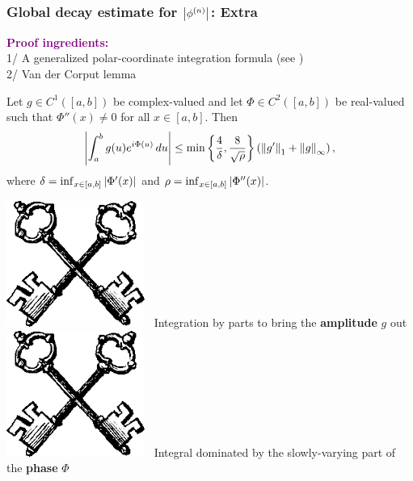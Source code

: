 \documentclass{beamer}
\theoremstyle{definition}
\newcommand{\lp}{\left(}
\newcommand{\rp}{\right)}
\newcommand{\lc}{\left\{}
\newcommand{\rc}{\right\}}
\begin{document}
\begin{frame}
\frametitle{Global decay estimate for $\abs{\phi^{(n)}}$: Extra}


\textcolor{purple}{\textbf{Proof ingredients:}} \\

1/ A generalized polar-coordinate integration formula (see \cite{bui2021generalized})\\
2/ Van der Corput lemma

\begin{lemma}
	Let $g\in C^1([a,b])$ be complex-valued and let $\Phi\in C^2([a,b])$ be real-valued such that $\Phi''(x) \neq 0$ for all $x\in [a,b]$. Then
	\begin{equation*}
	\abs{\int^b_a g(u) e^{i\Phi(u)}\,du} \leq \min \lc \frac{4}{\delta}, \frac{8}{\sqrt{\rho}}  \rc \lp \norm{g'}_1 + \norm{g}_\infty \rp,
	\end{equation*}
	where $\delta = \inf_{x\in [a,b]} \abs{\Phi'(x)}$ and $\rho = \inf_{x\in [a,b]} \abs{\Phi''(x)}$. 
\end{lemma}

\includegraphics[scale=0.06]{key}$\,\,\,$ Integration by parts to bring the \textbf{amplitude} $g$ out\\
\includegraphics[scale=0.06]{key}$\,\,\,$ Integral dominated by the slowly-varying part of the \textbf{phase} $\Phi$



\end{frame}
\end{document}
